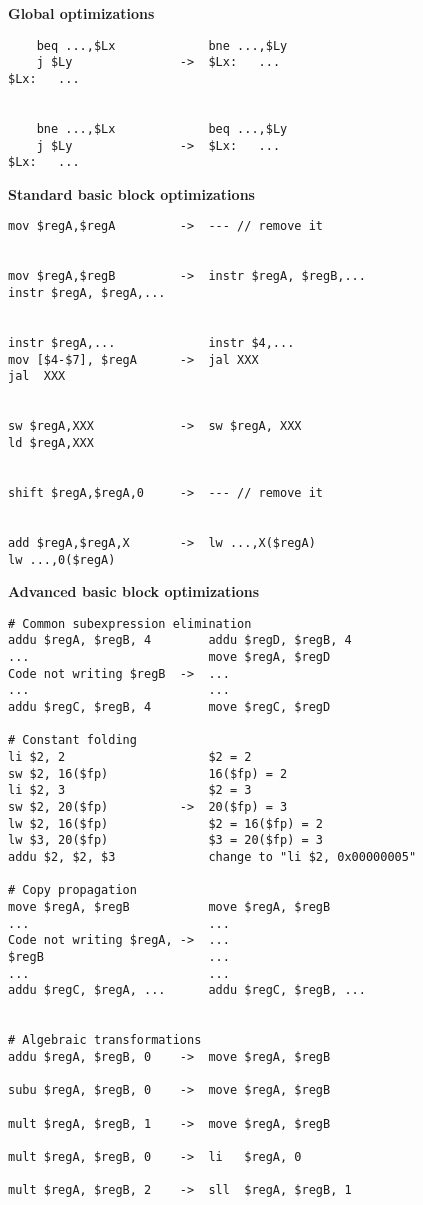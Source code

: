 \documentclass[10pt,a4paper]{article}
\begin{document}
\label{opt}

\textbf{Global optimizations}

\begin{verbatim}
    beq ...,$Lx             bne ...,$Ly
    j $Ly               ->  $Lx:   ...
$Lx:   ...


    bne ...,$Lx             beq ...,$Ly
    j $Ly               ->  $Lx:   ...
$Lx:   ...
\end{verbatim}
\textbf{Standard basic block optimizations}

\begin{verbatim}
mov $regA,$regA         ->  --- // remove it


mov $regA,$regB         ->  instr $regA, $regB,...
instr $regA, $regA,...


instr $regA,...             instr $4,...
mov [$4-$7], $regA      ->  jal XXX
jal  XXX


sw $regA,XXX            ->  sw $regA, XXX
ld $regA,XXX


shift $regA,$regA,0     ->  --- // remove it


add $regA,$regA,X       ->  lw ...,X($regA)
lw ...,0($regA)
\end{verbatim}
\textbf{Advanced basic block optimizations}

\begin{verbatim}
# Common subexpression elimination
addu $regA, $regB, 4        addu $regD, $regB, 4
...                         move $regA, $regD
Code not writing $regB  ->  ...
...                         ...
addu $regC, $regB, 4        move $regC, $regD

# Constant folding
li $2, 2                    $2 = 2
sw $2, 16($fp)              16($fp) = 2
li $2, 3                    $2 = 3
sw $2, 20($fp)          ->  20($fp) = 3
lw $2, 16($fp)              $2 = 16($fp) = 2
lw $3, 20($fp)              $3 = 20($fp) = 3
addu $2, $2, $3             change to "li $2, 0x00000005"

# Copy propagation
move $regA, $regB           move $regA, $regB
...                         ...
Code not writing $regA, ->  ...
$regB                       ...
...                         ...
addu $regC, $regA, ...      addu $regC, $regB, ...


# Algebraic transformations
addu $regA, $regB, 0    ->  move $regA, $regB

subu $regA, $regB, 0    ->  move $regA, $regB

mult $regA, $regB, 1    ->  move $regA, $regB

mult $regA, $regB, 0    ->  li   $regA, 0

mult $regA, $regB, 2    ->  sll  $regA, $regB, 1
\end{verbatim}
\end{document}
